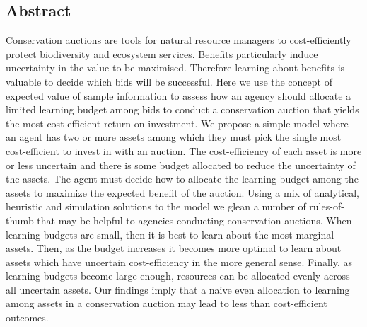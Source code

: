 
\subsection*{Abstract}\label{abstract}

Conservation auctions are tools for natural resource managers to cost-efficiently protect biodiversity and ecosystem services. Benefits particularly induce uncertainty in the value to be maximised. Therefore learning about benefits is valuable to decide which bids will be successful. Here we use the concept of expected value of sample information to assess how an agency should allocate a limited learning budget among bids to conduct a conservation auction that yields the most cost-efficient return on investment. We propose a simple model where an agent has two or more assets among which they must pick the single most cost-efficient to invest in with an auction. The cost-efficiency of each asset is more or less uncertain and there is some budget allocated to reduce the uncertainty of the assets. The agent must decide how to allocate the learning budget among the assets to maximize the expected benefit of the auction. Using a mix of analytical, heuristic and simulation solutions to the model we glean a number of rules-of-thumb that may be helpful to agencies conducting conservation auctions. When learning budgets are small, then it is best to learn about the most marginal assets. Then, as the budget increases it becomes more optimal to learn about assets which have uncertain cost-efficiency in the more general sense. Finally, as learning budgets become large enough, resources can be allocated evenly across all uncertain assets. Our findings imply that a naive even allocation to learning among assets in a conservation auction may lead to less than cost-efficient outcomes.
